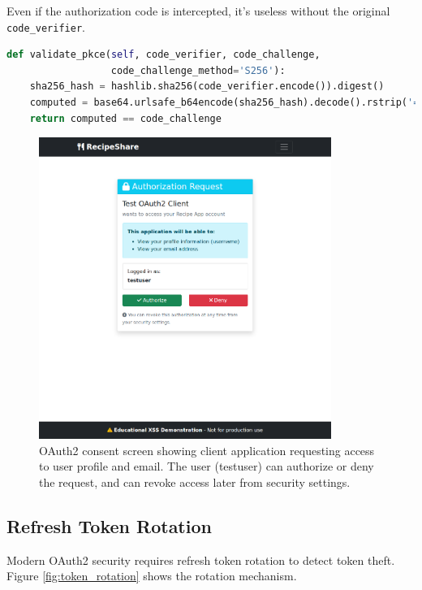 \documentclass[12pt,a4paper]{article}
\begin{document}
Even if the authorization code is intercepted, it's useless without the original \texttt{code\_verifier}.

\begin{lstlisting}[language=Python, caption=PKCE Validation]
def validate_pkce(self, code_verifier, code_challenge,
                  code_challenge_method='S256'):
    sha256_hash = hashlib.sha256(code_verifier.encode()).digest()
    computed = base64.urlsafe_b64encode(sha256_hash).decode().rstrip('=')
    return computed == code_challenge
\end{lstlisting}

\begin{figure}[H]
    \centering
    \includegraphics[width=0.85\textwidth]{SCREENSHOTs/oauth2_consent.png}
    \caption{OAuth2 consent screen showing client application requesting access to user profile and email. The user (testuser) can authorize or deny the request, and can revoke access later from security settings.}
    \label{fig:oauth_consent}
\end{figure}

\subsection{Refresh Token Rotation}

Modern OAuth2 security requires refresh token rotation to detect token theft. Figure \ref{fig:token_rotation} shows the rotation mechanism.
\end{document}
